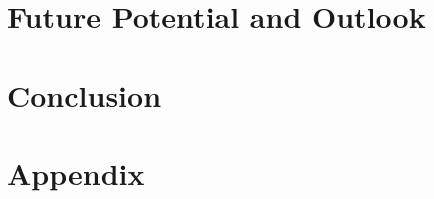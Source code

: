 \documentclass[12pt, a4paper]{article}
\begin{document}
\section{Future Potential and Outlook}\label{sec::outlook}
\section{Conclusion}\label{sec::conclusion}

\newpage
\renewcommand{\thesubsection}{\Alph{subsection}}
\setcounter{page}{\value{lastroman}}
\section*{Appendix}


\newpage



\newpage
\listoffigures
\listoftables



% 


\end{document}
